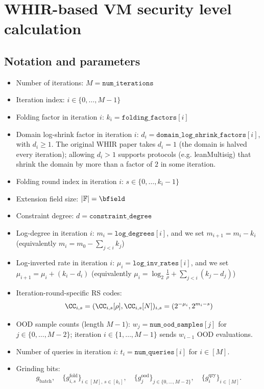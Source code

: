 \newpage

\section{WHIR-based VM security level calculation}\label{sec:whir_security_level}




\subsection{Notation and parameters}\label{sec:whir_notation}

\begin{itemize}
  \item Number of iterations: \(M = \texttt{num\_iterations}\)
  \item Iteration index: \(i \in \{0,\dots,M-1\}\)
  \item Folding factor in iteration \(i\): \(k_i = \texttt{folding\_factors}[i]\)
  \item Domain log-shrink factor in iteration \(i\): \(d_i = \texttt{domain\_log\_shrink\_factors}[i]\), with \(d_i \geq 1\). The original WHIR paper takes \(d_i = 1\) (the domain is halved every iteration); allowing \(d_i > 1\) supports protocols (e.g. leanMultisig) that shrink the domain by more than a factor of \(2\) in some iteration.
  \item Folding round index in iteration \(i\): \(s \in \{0,\dots,k_i-1\}\)
  \item Extension field size: \(|\mathbb{F}| = \bfield\)
  \item Constraint degree: \(d = \texttt{constraint\_degree}\)
  \item Log-degree in iteration \(i\): \(m_i = \texttt{log\_degrees}[i]\), and we set $m_{i+1} = m_i - k_i$ (equivalently $m_i = m_0 - \sum_{j<i} k_j$)
  \item Log-inverted rate in iteration \(i\): \(\mu_i = \texttt{log\_inv\_rates}[i]\), and we set $\mu_{i+1} = \mu_i + (k_i - d_i)$ (equivalently $\mu_i = \log_2 \frac{1}{\rho} + \sum_{j<i}(k_j - d_j)$)
  \item Iteration-round-specific RS codes:
  $$
  \CC_{i,s}=(\CC_{i,s}[\rho],\CC_{i,s}[N])_{i,s}=(2^{-\mu_i},2^{m_i-s})
  $$
  \item OOD sample counts (length \(M-1\)): \(w_j = \texttt{num\_ood\_samples}[j]\) for \(j\in\{0,\ldots,M-2\}\); iteration \(i\in\{1,\ldots,M-1\}\) sends \(w_{i-1}\) OOD evaluations.
  \item Number of queries in iteration \(i\): \(t_i = \texttt{num\_queries}[i]\) for \(i\in[M]\).
  \item Grinding bits:
    \[
      g_{\mathrm{batch}},\quad
      \{g^{\mathrm{fold}}_{i,s}\}_{i\in [M],\,s\in[k_i]},\quad
      \{g^{\mathrm{ood}}_j\}_{j\in\{0,\ldots,M-2\}},\quad
      \{g^{\mathrm{qry}}_i\}_{i\in[M]}.
    \]
\end{itemize}



